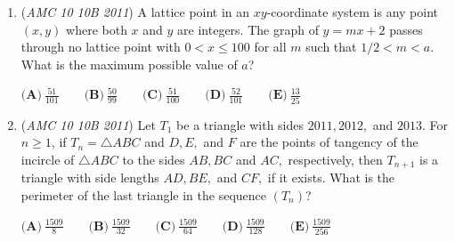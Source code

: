 \begin{enumerate}
 $\textbf{(A)}\ 1 \qquad\textbf{(B)}\ 4 \qquad\textbf{(C)}\ 5 \qquad\textbf{(D)}\ 6 \qquad\textbf{(E)}\ 9$


	\item (\textit{AMC 10 10B 2011}) A lattice point in an $xy$-coordinate system is any point $(x, y)$ where both $x$ and $y$ are integers. The graph of $y = mx +2$ passes through no lattice point with $0 < x \le 100$ for all $m$ such that $1/2 < m < a$. What is the maximum possible value of $a$?


 $\textbf{(A)}\ \frac{51}{101} \qquad\textbf{(B)}\ \frac{50}{99} \qquad\textbf{(C)}\ \frac{51}{100} \qquad\textbf{(D)}\ \frac{52}{101} \qquad\textbf{(E)}\ \frac{13}{25}$


	\item (\textit{AMC 10 10B 2011}) Let $T_1$ be a triangle with sides $2011, 2012,$ and $2013$. For $n \ge 1$, if $T_n = \triangle ABC$ and $D, E,$ and $F$ are the points of tangency of the incircle of $\triangle ABC$ to the sides $AB, BC$ and $AC,$ respectively, then $T_{n+1}$ is a triangle with side lengths $AD, BE,$ and $CF,$ if it exists. What is the perimeter of the last triangle in the sequence $( T_n )$?


 $\textbf{(A)}\ \frac{1509}{8} \qquad\textbf{(B)}\ \frac{1509}{32} \qquad\textbf{(C)}\ \frac{1509}{64} \qquad\textbf{(D)}\ \frac{1509}{128} \qquad\textbf{(E)}\ \frac{1509}{256}$


\end{enumerate}